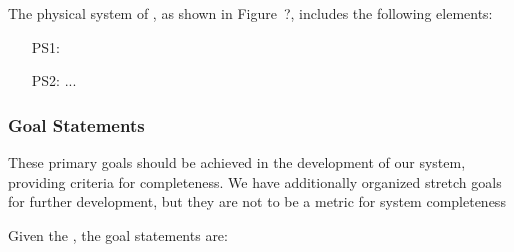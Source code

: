 
The physical system of \progname{}, as shown in Figure~?,
includes the following elements:

\begin{itemize}

\item[PS1:] 

\item[PS2:] ...

\end{itemize}



\subsubsection{Goal Statements}

These primary goals should be achieved in the development of our system, providing criteria for completeness. We have additionally organized stretch goals for further development, but they are not to be a metric for system completeness

\noindent Given the , the goal statements are:

